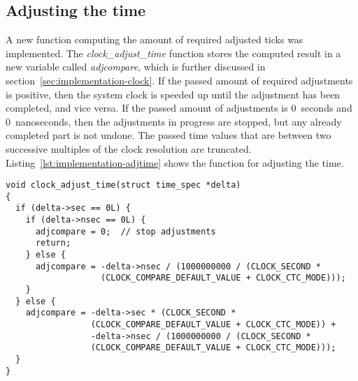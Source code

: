 \subsection{Adjusting the time}
A new function computing the amount of required adjusted ticks was implemented.
The {\it{clock\_adjust\_time}} function stores the computed result in
a new variable called {\it{adjcompare}}, which is further discussed in section~\ref{sec:implementation-clock}.
If the passed amount of required adjustments is positive, then the system clock is speeded up until
the adjustment has been completed, and vice versa.
If the passed amount of adjustments is 0~seconds and 0~nanoseconds,
then the adjustments in progress are stopped, but any already completed part is not undone.
The passed time values that are between two successive multiples of the clock resolution are truncated.
Listing~\ref{lst:implementation-adjtime} shows the function for adjusting the time.
\begin{lstlisting}[caption={Function for adjusting the time},label={lst:implementation-adjtime}]
void clock_adjust_time(struct time_spec *delta)
{
  if (delta->sec == 0L) {
    if (delta->nsec == 0L) {
      adjcompare = 0;  // stop adjustments
      return;
    } else {
      adjcompare = -delta->nsec / (1000000000 / (CLOCK_SECOND *
                   (CLOCK_COMPARE_DEFAULT_VALUE + CLOCK_CTC_MODE)));
    }
  } else {
    adjcompare = -delta->sec * (CLOCK_SECOND *
                 (CLOCK_COMPARE_DEFAULT_VALUE + CLOCK_CTC_MODE)) +
                 -delta->nsec / (1000000000 / (CLOCK_SECOND *
                 (CLOCK_COMPARE_DEFAULT_VALUE + CLOCK_CTC_MODE)));
  }
}
\end{lstlisting}
